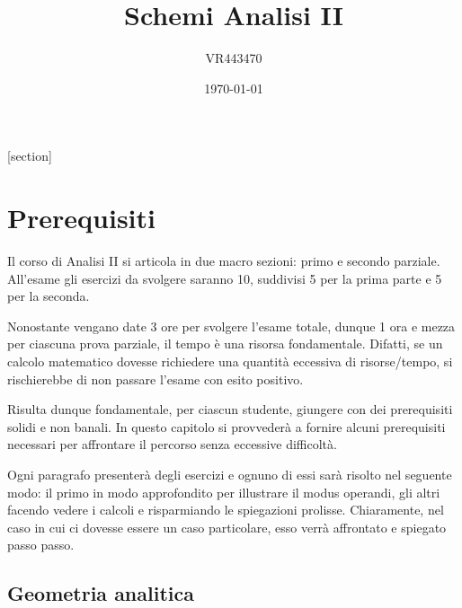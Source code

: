 \documentclass[a4paper]{article}
\begin{document}
	[section]

	\author{VR443470}
	\title{Schemi Analisi II}
	\date{\printdayoff\today}
	\maketitle
	
	\newpage
	
	\tableofcontents
	
	\newpage
	
	\section{Prerequisiti}\label{section: prerequisiti}
	
	Il corso di Analisi II si articola in due macro sezioni: primo e secondo parziale. All'esame gli esercizi da svolgere saranno 10, suddivisi 5 per la prima parte e 5 per la seconda.\newline
	
	\noindent
	Nonostante vengano date 3 ore per svolgere l'esame totale, dunque 1 ora e mezza per ciascuna prova parziale, il tempo è una risorsa fondamentale. Difatti, se un calcolo matematico dovesse richiedere una quantità eccessiva di risorse/tempo, si rischierebbe di non passare l'esame con esito positivo.\newline
	
	\noindent
	Risulta dunque fondamentale, per ciascun studente, giungere con dei prerequisiti solidi e non banali. In questo capitolo si provvederà a fornire alcuni prerequisiti necessari per affrontare il percorso senza eccessive difficoltà.\newline
	
	\noindent
	Ogni paragrafo presenterà degli esercizi e ognuno di essi sarà risolto nel seguente modo: il primo in modo approfondito per illustrare il modus operandi, gli altri facendo vedere i calcoli e risparmiando le spiegazioni prolisse. Chiaramente, nel caso in cui ci dovesse essere un caso particolare, esso verrà affrontato e spiegato passo passo.\newpage
	
	\subsection{Geometria analitica}\label{subsection: geometria analitica}
	
\end{document}
